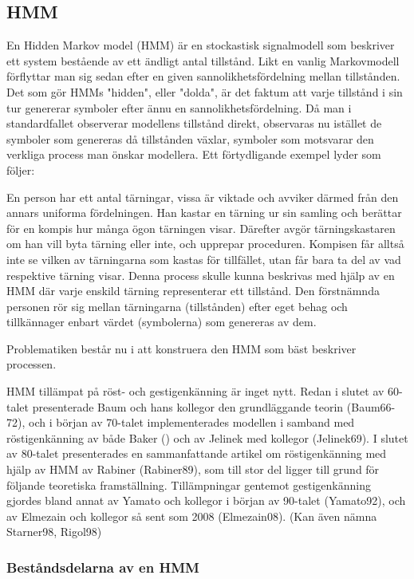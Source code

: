 \documentclass[../rapport_MVEX01-11-05]{subfiles}
\begin{document}
\subsection{HMM}

En Hidden Markov model (HMM) är en stockastisk signalmodell som
beskriver ett system bestående av ett ändligt antal tillstånd. Likt en
vanlig Markovmodell förflyttar man sig sedan efter en given
sannolikhetsfördelning mellan tillstånden. Det som gör HMMs "hidden",
eller "dolda", är det faktum att varje tillstånd i sin tur genererar
symboler efter ännu en sannolikhetsfördelning. Då man i standardfallet
observerar modellens tillstånd direkt, observaras nu istället de
symboler som genereras då tillstånden växlar, symboler som motsvarar
den verkliga process man önskar modellera. Ett förtydligande exempel
lyder som följer: 

En person har ett antal tärningar, vissa är viktade och avviker därmed
från den annars uniforma fördelningen. Han kastar en tärning ur sin
samling och berättar för en kompis hur många ögon tärningen
visar. Därefter avgör tärningskastaren om han vill byta tärning eller
inte, och upprepar proceduren. Kompisen får alltså inte se vilken av
tärningarna som kastas för tillfället, utan får bara ta del av vad
respektive tärning visar. Denna process skulle kunna beskrivas med
hjälp av en HMM där varje enskild tärning representerar ett
tillstånd. Den förstnämnda personen rör sig mellan tärningarna
(tillstånden) efter eget behag och tillkännager enbart värdet
(symbolerna) som genereras av dem. 

Problematiken består nu i att konstruera den HMM som bäst beskriver
processen.  

HMM tillämpat på röst- och gestigenkänning är inget nytt. Redan i
slutet av 60-talet presenterade Baum och hans kollegor den
grundläggande teorin (Baum66-72), och i början av 70-talet
implementerades modellen i samband med röstigenkänning av både Baker
(\cite{Baker75}) och av Jelinek med kollegor (Jelinek69). I slutet av
80-talet presenterades en sammanfattande artikel om röstigenkänning
med hjälp av HMM av Rabiner (Rabiner89), som till stor del ligger till
grund för följande teoretiska framställning. Tillämpningar gentemot
gestigenkänning gjordes bland annat av Yamato och kollegor i början av
90-talet (Yamato92), och av Elmezain och kollegor så sent som 2008
(Elmezain08). (Kan även nämna Starner98, Rigol98)

\subsubsection{Beståndsdelarna av en HMM}
\end{document}
